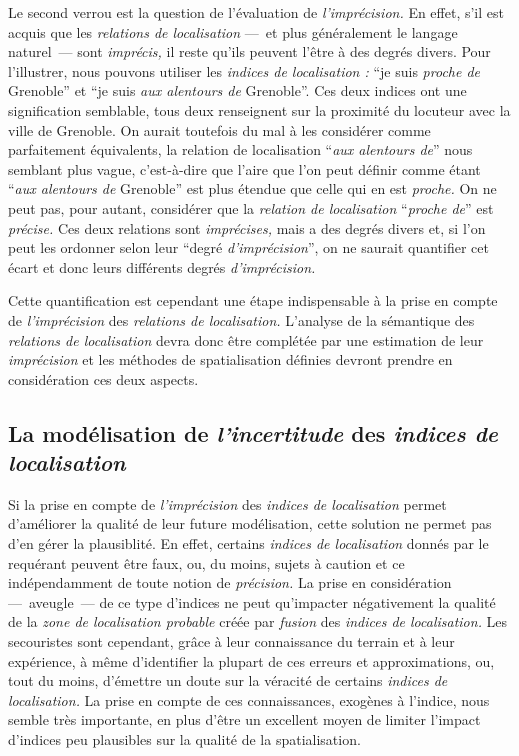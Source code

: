 Le second verrou est la question de l'évaluation de
\emph{l'imprécision.} En effet, s'il est acquis que les
\emph{relations de localisation} ---~et plus généralement le langage
naturel~--- sont \emph{imprécis,} il reste qu'ils peuvent l'être à des
degrés divers. Pour l'illustrer, nous pouvons utiliser les
\emph{indices de localisation :} \enquote{je suis \emph{proche de}
  Grenoble} et \enquote{je suis \emph{aux alentours de} Grenoble}. Ces
deux indices ont une signification semblable, tous deux renseignent
sur la proximité du locuteur avec la ville de Grenoble. On aurait
toutefois du mal à les considérer comme parfaitement équivalents, la
relation de localisation \enquote{\emph{aux alentours de}} nous
semblant plus vague, c'est-à-dire que l'aire que l'on peut définir
comme étant \enquote{\emph{aux alentours de} Grenoble} est plus
étendue que celle qui en est \emph{proche.} On ne peut pas, pour
autant, considérer que la \emph{relation de localisation}
\enquote{\emph{proche de}} est \emph{précise.} Ces deux relations sont
\emph{imprécises,} mais a des degrés divers et, si l'on peut les
ordonner selon leur \enquote{degré \emph{d'imprécision}}, on ne
saurait quantifier cet écart et donc leurs différents degrés
\emph{d'imprécision.}

Cette quantification est cependant une étape indispensable à la prise
en compte de \emph{l'imprécision} des \emph{relations de
  localisation.} L'analyse de la sémantique des \emph{relations de
  localisation} devra donc être complétée par une estimation de leur
\emph{imprécision} et les méthodes de spatialisation définies devront
prendre en considération ces deux aspects.

\subsection{La modélisation de \emph{l'incertitude} des \emph{indices
    de localisation}}
\label{subsec:2-1-3}

Si la prise en compte de \emph{l'imprécision} des \emph{indices de
  localisation} permet d'améliorer la qualité de leur future
modélisation, cette solution ne permet pas d'en gérer la
plausiblité. En effet, certains \emph{indices de localisation} donnés
par le requérant peuvent être faux, ou, du moins, sujets à caution et
ce indépendamment de toute notion de \emph{précision.} La prise en
considération ---~aveugle~--- de ce type d'indices ne peut qu'impacter
négativement la qualité de la \emph{zone de localisation probable}
créée par \emph{fusion} des \emph{indices de localisation.} Les
secouristes sont cependant, grâce à leur connaissance du terrain et à
leur expérience, à même d'identifier la plupart de ces erreurs et
approximations, ou, tout du moins, d’émettre un doute sur la véracité
de certains \emph{indices de localisation.} La prise en compte de ces
connaissances, exogènes à l'indice, nous semble très importante, en
plus d'être un excellent moyen de limiter l'impact d'indices peu
plausibles sur la qualité de la spatialisation.

